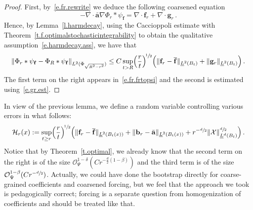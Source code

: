 \documentclass[11pt]{article} %
\numberwithin{equation}{section}
\theoremstyle{definition}
\let\originalleft\left
\let\originalright\right
\renewcommand{\left}{\mathopen{}\mathclose\bgroup\originalleft}
\renewcommand{\right}{\aftergroup\egroup\originalright}
\renewcommand{\b}{\ensuremath{\mathbf{b}}}
\newcommand{\f}{\mathbf{f}}
\newcommand{\g}{\mathbf{g}}
\renewcommand{\a}{\mathbf{a}}
\newcommand{\ahom}{\bar{\a}}
\newcommand{\X}{\mathcal{X}}
\renewcommand{\O}{\mathcal{O}}
\begin{document}
\begin{proof}
First, by~\eqref{e.fr.rewrite} we deduce the following coarsened equation
\begin{equation}  \label{e.fr.coarse.eq}
- \nabla \cdot \ahom \nabla \Phi_r \ast  \psi_\f  
= 
\nabla \cdot \f_r + \nabla \cdot \g_r 
\,. 
\end{equation}
Hence, by Lemma~\ref{l.harmdecay}, using the Caccioppoli estimate with Theorem~\ref{t.f.optimalstochasticintegrability} to obtain the qualitative assumption~\eqref{e.harmdecay.ass}, we have that 
\begin{equation*}  
\left\| \Phi_r \ast  \psi_\f  - \Phi_R \ast  \psi_\f  \right\|_{L^2 ( \Phi_{\sqrt{R^2-r^2}})} 
\leq 
C \sup_{t>R}  \Bigl( \frac{r}{t} \Bigr)^{\!\sfrac12} 
\Bigl(  \| \f_r - \overline{\f} \|_{\underline{L}^2 \left( B_{t} \right)}  +  \| \g_r \|_{\underline{L}^2 \left( B_{t} \right)} \Bigr) \,.
\end{equation*}
The first term on the right appears in~\eqref{e.fr.frtopsi} and the second is estimated using~\eqref{e.gr.est}.  
\end{proof}

In view of the previous lemma, we define a random variable controlling various errors in what follows:
\begin{align}  \label{e.uglyH}
\mathcal{H}_r(x) := 
\sup_{t \geq r}  \Bigl( \frac{r}{t} \Bigr)^{\!\sfrac12} 
\Bigl( 
\| \f_r - \overline{\f}  \|_{\underline{L}^2 \left( B_{t}(x) \right)} 
+ 
\| \b_r - \ahom  \|_{\underline{L}^2 \left( B_{t}(x) \right)} 
+ 
r^{-\sfrac d2}  \| \X \|_{\underline{L}^d \left( B_{t} \right)}^{\sfrac d2} 
\Bigr)
\,.
\end{align}
Notice that by Theorem~\ref{t.optimal}, we already know that the second term on the right is of the size $\O_\Psi^{1-\delta}(Cr^{-\frac d2(1-\beta)})$ and the third term is of the size $\O_\Psi^{1-\beta}(Cr^{-\sfrac d2})$. Actually, we could have done the bootstrap directly for coarse-grained coefficients and coarsened forcing, but we feel that the approach we took is pedagogically correct; forcing is a separate question from homogenization of coefficients and should be treated like that. 
\end{document}
